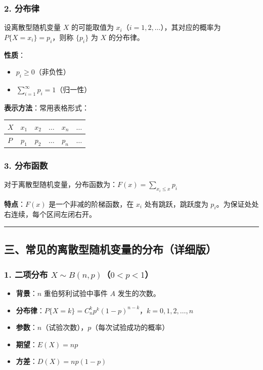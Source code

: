 \documentclass[12pt,a4paper]{ctexart}
\begin{document}
\subsubsection{2. 分布律}
设离散型随机变量 $X$ 的可能取值为 $x_i$（$i = 1,2,\dots$），其对应的概率为 $P\{X = x_i\} = p_i$，则称 $\{p_i\}$ 为 $X$ 的分布律。

\textbf{性质}：
\begin{itemize}[noitemsep]
    \item $p_i \ge 0$（非负性）
    \item $\sum_{i=1}^{\infty} p_i = 1$（归一性）
\end{itemize}

\textbf{表示方法}：常用表格形式：
\begin{center}
    \begin{tabular}{@{}lccccc@{}}
        \toprule
        $X$ & $x_1$ & $x_2$ & $\dots$ & $x_n$ & $\dots$ \\ \midrule
        $P$ & $p_1$ & $p_2$ & $\dots$ & $p_n$ & $\dots$ \\ \bottomrule
    \end{tabular}
\end{center}

\subsubsection{3. 分布函数}
对于离散型随机变量，分布函数为：$F(x) = \sum_{x_i \le x} p_i$

\textbf{特点}：$F(x)$ 是一个非减的阶梯函数，在 $x_i$ 处有跳跃，跳跃度为 $p_i$。为保证处处右连续，每个区间左闭右开。

\vspace{1em}\hrule\vspace{1em}

\subsection{三、常见的离散型随机变量的分布（详细版）}

\subsubsection{1. 二项分布 $X \sim B(n, p)$（$0 < p < 1$）}
\begin{itemize}[noitemsep]
    \item \textbf{背景}：$n$ 重伯努利试验中事件 $A$ 发生的次数。
    \item \textbf{分布律}：$P\{X = k\} = C_n^k p^k (1-p)^{n-k}$，$k = 0,1,2,\dots,n$
    \item \textbf{参数}：$n$（试验次数），$p$（每次试验成功的概率）
    \item \textbf{期望}：$E(X) = np$
    \item \textbf{方差}：$D(X) = np(1-p)$
\end{itemize}
\end{document}
